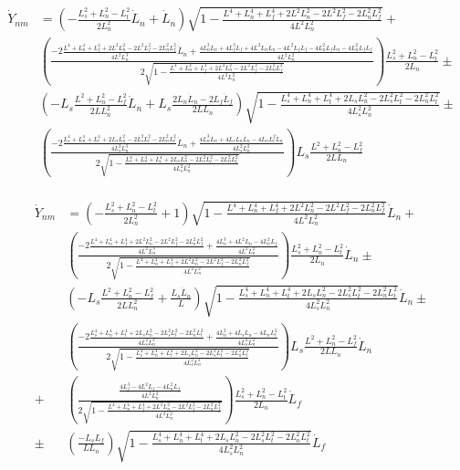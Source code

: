 \documentclass[11pt, landscape]{article}
\begin{document}
\begin{align}
    \dot{Y}_{nm} &=
    \left(-\frac{L_{s}^2+L_{n}^2-L_{t}^2}{2L_n^2}\dot{L}_n + \dot{L}_n\right)\sqrt{1-\frac{L^4 + L_n^4 + L_f^4 + 2L^2L_n^2 - 2L^2L_f^2 - 2L_n^2L_f^2}{4L^2L_n^2}} +\\
    &\left(\frac{-2\frac{L^4 + L_n^4 + L_f^4 + 2L^2L_n^2 - 2L^2L_f^2 - 2L_n^2L_f^2}{4L^2L_n^3}\dot{L}_n + \frac{4L_n^3\dot{L}_n + 4L_f^3\dot{L}_f + 4L^2L_n\dot{L}_n - 4L^2L_f\dot{L}_f - 4L_n^2L_f\dot{L}_n - 4L_n^2L_f\dot{L}_f}{4L^2L_n^2}}{2\sqrt{1-\frac{L^4 + L_n^4 + L_f^4 + 2L^2L_n^2 - 2L^2L_f^2 - 2L_n^2L_f^2}{4L^2L_n^2}}}\right)\frac{L_{s}^2+L_{n}^2-L_{t}^2}{2L_{n}} \pm\\   
    &\left(-L_s\frac{L^2+L_{n}^2-L_{f}^2}{2LL_{n}^2}\dot{L}_n + L_s\frac{2L_{n}\dot{L}_n - 2L_{f}\dot{L}_f}{2LL_{n}}\right)\sqrt{1-\frac{L_s^4 + L_n^4 + L_t^4 + 2L_sL_n^2 - 2L_s^2L_t^2 - 2L_n^2L_t^2}{4L_s^2L_n^2}} \pm\\
    &\left(\frac{-2\frac{L_s^4 + L_n^4 + L_t^4 + 2L_sL_n^2 - 2L_s^2L_t^2 - 2L_n^2L_t^2}{4L_s^2L_n^3}\dot{L}_n + \frac{4L_n^3\dot{L}_n + 4L_sL_n\dot{L}_n - 4L_nL_t^2\dot{L}_n}{4L_s^2L_n^2}}{2\sqrt{1-\frac{L_s^4 + L_n^4 + L_t^4 + 2L_sL_n^2 - 2L_s^2L_t^2 - 2L_n^2L_t^2}{4L_s^2L_n^2}}}\right)L_s\frac{L^2+L_{n}^2-L_{f}^2}{2LL_{n}}\\
\end{align}

\begin{align}
    \dot{Y}_{nm} &=
    \left(-\frac{L_{s}^2+L_{n}^2-L_{t}^2}{2L_n^2} + 1\right)\sqrt{1-\frac{L^4 + L_n^4 + L_f^4 + 2L^2L_n^2 - 2L^2L_f^2 - 2L_n^2L_f^2}{4L^2L_n^2}}\dot{L}_n +\\
    &\left(\frac{-2\frac{L^4 + L_n^4 + L_f^4 + 2L^2L_n^2 - 2L^2L_f^2 - 2L_n^2L_f^2}{4L^2L_n^3} + \frac{4L_n^3 + 4L^2L_n - 4L_n^2L_f}{4L^2L_n^2}}{2\sqrt{1-\frac{L^4 + L_n^4 + L_f^4 + 2L^2L_n^2 - 2L^2L_f^2 - 2L_n^2L_f^2}{4L^2L_n^2}}}\right)\frac{L_{s}^2+L_{n}^2-L_{t}^2}{2L_{n}}\dot{L}_n \pm\\
    &\left(-L_s\frac{L^2+L_{n}^2-L_{f}^2}{2LL_{n}^2} + \frac{L_s\dot{L}_n}{L}\right)\sqrt{1-\frac{L_s^4 + L_n^4 + L_t^4 + 2L_sL_n^2 - 2L_s^2L_t^2 - 2L_n^2L_t^2}{4L_s^2L_n^2}}\dot{L}_n \pm\\
    &\left(\frac{-2\frac{L_s^4 + L_n^4 + L_t^4 + 2L_sL_n^2 - 2L_s^2L_t^2 - 2L_n^2L_t^2}{4L_s^2L_n^3} + \frac{4L_n^3 + 4L_sL_n - 4L_nL_t^2}{4L_s^2L_n^2}}{2\sqrt{1-\frac{L_s^4 + L_n^4 + L_t^4 + 2L_sL_n^2 - 2L_s^2L_t^2 - 2L_n^2L_t^2}{4L_s^2L_n^2}}}\right)L_s\frac{L^2+L_{n}^2-L_{f}^2}{2LL_{n}}\dot{L}_n\\
    + &\left(\frac{\frac{4L_f^3 - 4L^2L_f - 4L_n^2L_f}{4L^2L_n^2}}{2\sqrt{1-\frac{L^4 + L_n^4 + L_f^4 + 2L^2L_n^2 - 2L^2L_f^2 - 2L_n^2L_f^2}{4L^2L_n^2}}}\right)\frac{L_{s}^2+L_{n}^2-L_{t}^2}{2L_{n}}\dot{L}_f\\
    \pm &\left(\frac{-L_sL_{f}}{LL_{n}}\right)\sqrt{1-\frac{L_s^4 + L_n^4 + L_t^4 + 2L_sL_n^2 - 2L_s^2L_t^2 - 2L_n^2L_t^2}{4L_s^2L_n^2}}\dot{L}_f\\
\end{align}
\end{document}
